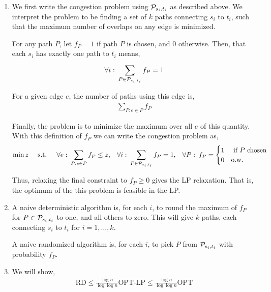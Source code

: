 \documentclass[10pt]{article}
\begin{document}
\begin{solution}[Solution]
\begin{enumerate}[label=(\alph*)]
    \item We first write the congestion problem using \( \mathcal{P}_{s_i,t_i} \) as described above. We interpret the problem to be finding a set of \( k \) paths connecting \( s_i \) to \( t_i \), such that the maximum number of overlaps on any edge is minimized.

        For any path \( P \), let \( f_P = 1\) if path \( P \) is chosen, and 0 otherwise. Then, that each \( s_i \) has exactly one path to \( t_i \) means,
        \begin{align*}
            \forall i: \: \sum_{P\in\mathcal{P}_{s_i,t_i}}^{} f_P = 1
        \end{align*}
        
        For a given edge \( e \), the number of paths using this edge is,
        \begin{align*}
            \sum_{P : e\in P} f_P
        \end{align*}
        
        Finally, the problem is to minimize the maximum over all \( e \) of this quantity. With this definition of \( f_P \) we can write the congestion problem as,
        \begin{align*}
            \min z 
            &&\text{ s.t. } 
            &&\forall e: \:\sum_{P:e\in P}^{} f_P \leq z, 
            &&\forall i: \:\sum_{P\in \mathcal{P}_{s_i,t_i}}^{} f_P = 1,
            &&\forall P: \:f_P = \begin{cases}1 & \text{ if \( P \) chosen} \\ 0 & \text{o.w.} \end{cases}
        \end{align*}
        
        Thus, relaxing the final constraint to \( f_P \geq 0 \) gives the LP relaxation. That is, the optimum of the this problem is feasible in the LP.
    
    \item A naive deterministic algorithm is, for each \( i \), to round the maximum of \( f_P \) for \( P\in\mathcal{P}_{s_i,t_i} \) to one, and all others to zero. This will give \( k \) paths, each connecting \( s_i \) to \( t_i \) for \( i=1,\ldots, k \).

        A naive randomized algorithm is, for each \( i \), to pick \( P \) from \( \mathcal{P}_{s_i,t_i} \) with probability \( f_P \).


    \item 
        We will show,
        \begin{align*}
            \text{RD} 
            \leq \frac{\log n}{\log \log n} \text{OPT-LP}
            \leq \frac{\log n}{\log \log n} \text{OPT}
        \end{align*}
        

\end{enumerate}
\end{solution}
\end{document}
